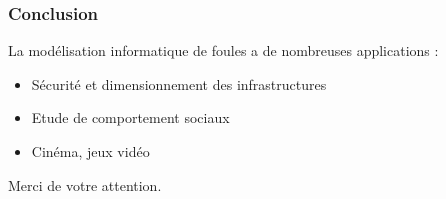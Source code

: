 \begin{frame}
    \frametitle{Conclusion}
    La modélisation informatique de foules a de nombreuses applications :\\
    \begin{itemize}
        \item <2-> Sécurité et dimensionnement des infrastructures
        \item <3-> Etude de comportement sociaux
        \item <4-> Cinéma, jeux vidéo
    \end{itemize}
    \bigskip
    \bigskip
    \huge{Merci de votre attention.}
\end{frame}
